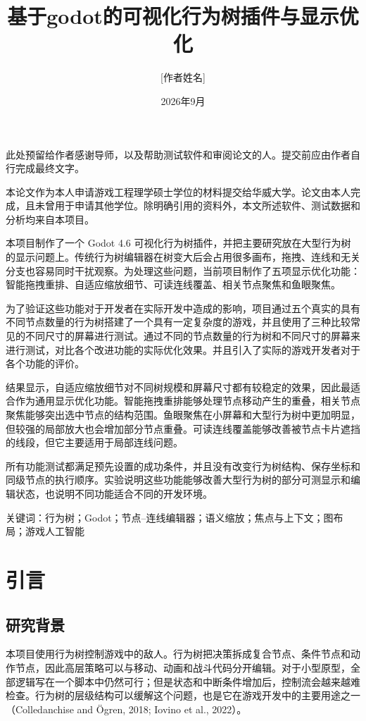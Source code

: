 \documentclass[11pt,a4paper,oneside,extrafontsizes]{memoir}
\title{基于godot的可视化行为树插件与显示优化}
\author{[作者姓名]}
\date{2026年9月}
\begin{document}
\frontmatter
{}
\tableofcontents
\clearforchapter\listoffigures
\clearforchapter\listoftables


此处预留给作者感谢导师，以及帮助测试软件和审阅论文的人。提交前应由作者自行完成最终文字。


本论文作为本人申请游戏工程理学硕士学位的材料提交给华威大学。论文由本人完成，且未曾用于申请其他学位。除明确引用的资料外，本文所述软件、测试数据和分析均来自本项目。


本项目制作了一个 Godot 4.6 可视化行为树插件，并把主要研究放在大型行为树的显示问题上。传统行为树编辑器在树变大后会占用很多画布，拖拽、连线和无关分支也容易同时干扰观察。为处理这些问题，当前项目制作了五项显示优化功能：智能拖拽重排、自适应缩放细节、可读连线覆盖、相关节点聚焦和鱼眼聚焦。

为了验证这些功能对于开发者在实际开发中造成的影响，项目通过五个真实的具有不同节点数量的行为树搭建了一个具有一定复杂度的游戏，并且使用了三种比较常见的不同尺寸的屏幕进行测试。通过不同的节点数量的行为树和不同尺寸的屏幕来进行测试，对比各个改进功能的实际优化效果。并且引入了实际的游戏开发者对于各个功能的评价。

结果显示，自适应缩放细节对不同树规模和屏幕尺寸都有较稳定的效果，因此最适合作为通用显示优化功能。智能拖拽重排能够处理节点移动产生的重叠，相关节点聚焦能够突出选中节点的结构范围。鱼眼聚焦在小屏幕和大型行为树中更加明显，但较强的局部放大也会增加部分节点重叠。可读连线覆盖能够改善被节点卡片遮挡的线段，但它主要适用于局部连线问题。

所有功能测试都满足预先设置的成功条件，并且没有改变行为树结构、保存坐标和同级节点的执行顺序。实验说明这些功能能够改善大型行为树的部分可测显示和编辑状态，也说明不同功能适合不同的开发环境。

关键词：行为树；Godot；节点–连线编辑器；语义缩放；焦点与上下文；图布局；游戏人工智能

\mainmatter

\chapter{引言}

\section{研究背景}

本项目使用行为树控制游戏中的敌人。行为树把决策拆成复合节点、条件节点和动作节点，因此高层策略可以与移动、动画和战斗代码分开编辑。对于小型原型，全部逻辑写在一个脚本中仍然可行；但是状态和中断条件增加后，控制流会越来越难检查。行为树的层级结构可以缓解这个问题，也是它在游戏开发中的主要用途之一（Colledanchise and Ögren, 2018; Iovino et al., 2022）。
\end{document}
